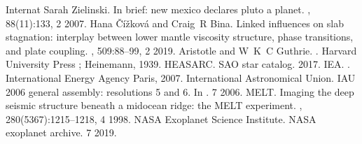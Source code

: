 \documentclass[letterpaper,10pt,english]{jupyterBook}
\begin{document}
\begin{sphinxthebibliography}{Internat}
\sphinxAtStartPar
Sarah Zielinski. In brief: new mexico declares pluto a planet. , 88(11):133, 2 2007.
\sphinxAtStartPar
Hana Čížková and Craig R Bina. Linked influences on slab stagnation: interplay between lower mantle viscosity structure, phase transitions, and plate coupling. , 509:88–99, 2 2019.
\sphinxAtStartPar
Aristotle and W K C Guthrie. . Harvard University Press ; Heinemann, 1939.
\sphinxAtStartPar
HEASARC. SAO star catalog. 2017.
\sphinxAtStartPar
IEA. . International Energy Agency Paris, 2007.
\sphinxAtStartPar
International Astronomical Union. IAU 2006 general assembly: resolutions 5 and 6. In . 7 2006.
\sphinxAtStartPar
MELT. Imaging the deep seismic structure beneath a mid\sphinxhyphen{}ocean ridge: the MELT experiment. , 280(5367):1215–1218, 4 1998.
\sphinxAtStartPar
NASA Exoplanet Science Institute. NASA exoplanet archive. 7 2019.
\end{sphinxthebibliography}







\renewcommand{\indexname}{Index}
\printindex
\end{document}
